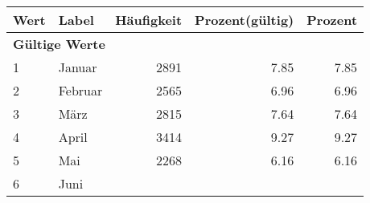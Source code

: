      \begin{longtable}{lXrrr}
     \toprule
     \textbf{Wert} & \textbf{Label} & \textbf{Häufigkeit} & \textbf{Prozent(gültig)} & \textbf{Prozent} \\
     \endhead
     \midrule
     \multicolumn{5}{l}{\textbf{Gültige Werte}}\\

     1 &
     \multicolumn{1}{X}{ Januar   } &


       \num{2891} &
       \num[round-mode=places,round-precision=2]{7,85} &
         \num[round-mode=places,round-precision=2]{7,85} \\

     2 &
     \multicolumn{1}{X}{ Februar   } &


       \num{2565} &
       \num[round-mode=places,round-precision=2]{6,96} &
         \num[round-mode=places,round-precision=2]{6,96} \\

     3 &
     \multicolumn{1}{X}{ März   } &


       \num{2815} &
       \num[round-mode=places,round-precision=2]{7,64} &
         \num[round-mode=places,round-precision=2]{7,64} \\

     4 &
     \multicolumn{1}{X}{ April   } &


       \num{3414} &
       \num[round-mode=places,round-precision=2]{9,27} &
         \num[round-mode=places,round-precision=2]{9,27} \\

     5 &
     \multicolumn{1}{X}{ Mai   } &


       \num{2268} &
       \num[round-mode=places,round-precision=2]{6,16} &
         \num[round-mode=places,round-precision=2]{6,16} \\

     6 &
     \multicolumn{1}{X}{ Juni   } &



\end{longtable}
